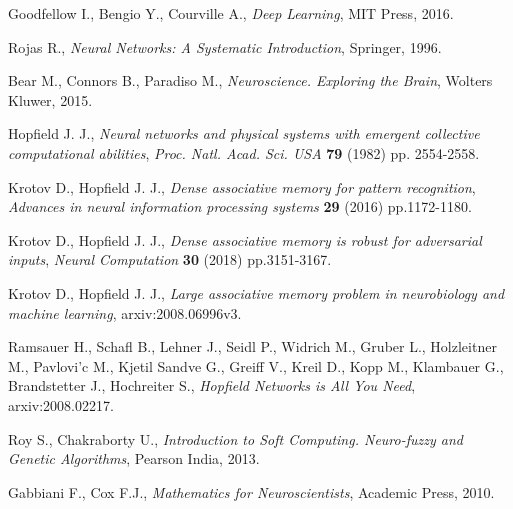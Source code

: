 \documentclass[letterpaper,12pt]{article}
\begin{document}
\begin{thebibliography}{99}

Goodfellow I., Bengio Y., Courville A., \emph{Deep Learning}, MIT Press, 2016.

Rojas R., \emph{Neural Networks: A Systematic Introduction}, Springer, 1996.

Bear M., Connors B., Paradiso M., \emph{Neuroscience. Exploring the Brain}, Wolters Kluwer, 2015.

Hopfield J. J., \emph{Neural networks and physical systems with emergent collective computational abilities}, \emph{Proc. Natl. Acad. Sci. USA} {\bf 79} (1982) pp. 2554-2558.

Krotov D., Hopfield J. J., \emph{Dense associative memory for pattern recognition}, \emph{Advances in neural information processing systems} {\bf 29} (2016) pp.1172-1180.

Krotov D., Hopfield J. J., \emph{Dense associative memory is robust for adversarial inputs}, \emph{Neural Computation} {\bf 30} (2018) pp.3151-3167.

Krotov D., Hopfield J. J., \emph{Large associative memory problem in neurobiology and machine learning}, arxiv:2008.06996v3.

Ramsauer H., Schafl B., Lehner J., Seidl P., Widrich M., Gruber L., Holzleitner M., Pavlovi'c M., Kjetil Sandve G., Greiff V., Kreil D., Kopp M., Klambauer G., Brandstetter J., Hochreiter S., \emph{Hopfield Networks is All You Need}, arxiv:2008.02217.

Roy S., Chakraborty U., \emph{Introduction to Soft Computing. Neuro-fuzzy and Genetic Algorithms}, Pearson India, 2013.

Gabbiani F., Cox F.J., \emph{Mathematics for Neuroscientists}, Academic Press, 2010.

\end{thebibliography}
\end{document}
